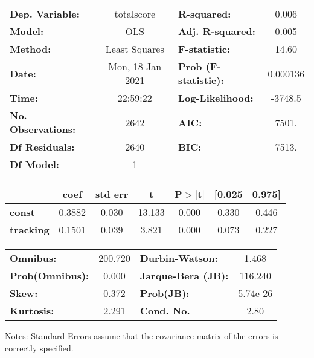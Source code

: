 \begin{center}
\begin{tabular}{lclc}
\toprule
\textbf{Dep. Variable:}    &    totalscore    & \textbf{  R-squared:         } &     0.006   \\
\textbf{Model:}            &       OLS        & \textbf{  Adj. R-squared:    } &     0.005   \\
\textbf{Method:}           &  Least Squares   & \textbf{  F-statistic:       } &     14.60   \\
\textbf{Date:}             & Mon, 18 Jan 2021 & \textbf{  Prob (F-statistic):} &  0.000136   \\
\textbf{Time:}             &     22:59:22     & \textbf{  Log-Likelihood:    } &   -3748.5   \\
\textbf{No. Observations:} &        2642      & \textbf{  AIC:               } &     7501.   \\
\textbf{Df Residuals:}     &        2640      & \textbf{  BIC:               } &     7513.   \\
\textbf{Df Model:}         &           1      & \textbf{                     } &             \\
\bottomrule
\end{tabular}
\begin{tabular}{lcccccc}
                  & \textbf{coef} & \textbf{std err} & \textbf{t} & \textbf{P$> |$t$|$} & \textbf{[0.025} & \textbf{0.975]}  \\
\midrule
\textbf{const}    &       0.3882  &        0.030     &    13.133  &         0.000        &        0.330    &        0.446     \\
\textbf{tracking} &       0.1501  &        0.039     &     3.821  &         0.000        &        0.073    &        0.227     \\
\bottomrule
\end{tabular}
\begin{tabular}{lclc}
\textbf{Omnibus:}       & 200.720 & \textbf{  Durbin-Watson:     } &    1.468  \\
\textbf{Prob(Omnibus):} &   0.000 & \textbf{  Jarque-Bera (JB):  } &  116.240  \\
\textbf{Skew:}          &   0.372 & \textbf{  Prob(JB):          } & 5.74e-26  \\
\textbf{Kurtosis:}      &   2.291 & \textbf{  Cond. No.          } &     2.80  \\
\bottomrule
\end{tabular}
\end{center}

Notes: \newline
 [1] Standard Errors assume that the covariance matrix of the errors is correctly specified.
